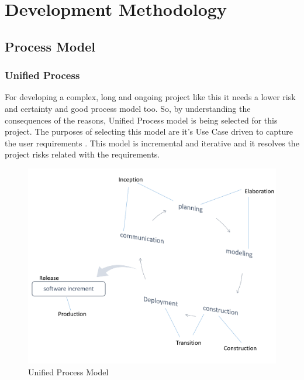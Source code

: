 \documentclass[12pt]{report} %
\begin{document}

















\chapter{Development Methodology}
\setcounter{page}{1}
\thispagestyle{empty}    %

\section{Process Model}
\subsection{Unified Process}
For developing a complex, long and ongoing project like this it needs a lower risk and certainty and good process model too. So, by understanding the consequences of the reasons, Unified Process model is being selected for this project. The purposes of selecting this model are it's Use Case driven to capture the user requirements . This model is incremental and iterative and it resolves the project risks related with the requirements.
%
\ifx
\begin{figure}[h]
	\begin{center}
	\includegraphics[width=1\textwidth]{pic/up_model.png}
	\end{center}
	\caption{Unified Process Model}
	\label{fig:up_model}
\end{figure}
\fi
\end{document}
